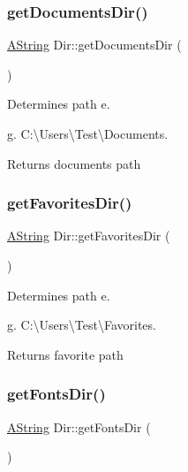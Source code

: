 \subsubsection{\texorpdfstring{getDocumentsDir()}{getDocumentsDir()}}
{\footnotesize\ttfamily \mbox{\hyperlink{class_a_string}{A\+String}} Dir\+::get\+Documents\+Dir (\begin{DoxyParamCaption}{ }\end{DoxyParamCaption})\hspace{0.3cm}{\ttfamily [static]}}



Determines path e. 

g. C\+:\textbackslash{}\+Users\textbackslash{}\+Test\textbackslash{}\+Documents. \begin{DoxyReturn}{Returns}
documents path 
\end{DoxyReturn}
\mbox{\label{class_dir_a858ffe5732fe3aac5c3fecdf3323c3db}} 
\subsubsection{\texorpdfstring{getFavoritesDir()}{getFavoritesDir()}}
{\footnotesize\ttfamily \mbox{\hyperlink{class_a_string}{A\+String}} Dir\+::get\+Favorites\+Dir (\begin{DoxyParamCaption}{ }\end{DoxyParamCaption})\hspace{0.3cm}{\ttfamily [static]}}



Determines path e. 

g. C\+:\textbackslash{}\+Users\textbackslash{}\+Test\textbackslash{}\+Favorites. \begin{DoxyReturn}{Returns}
favorite path 
\end{DoxyReturn}
\mbox{\label{class_dir_a3464ab82944089c65cddb8f7e5ef6f41}} 
\subsubsection{\texorpdfstring{getFontsDir()}{getFontsDir()}}
{\footnotesize\ttfamily \mbox{\hyperlink{class_a_string}{A\+String}} Dir\+::get\+Fonts\+Dir (\begin{DoxyParamCaption}{ }\end{DoxyParamCaption})\hspace{0.3cm}{\ttfamily [static]}}




